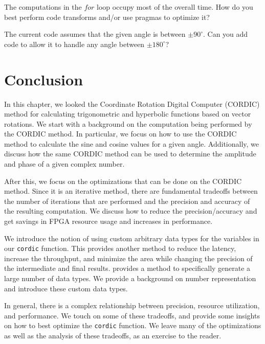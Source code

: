 \begin{exercise}
The computations in the $for$ loop occupy most of the overall time. How do you best perform code transforms and/or use pragmas to optimize it?
\end{exercise}

\begin{exercise}
The current code assumes that the given angle is between $\pm 90^{\circ}$. Can you add code to allow it to handle any angle between $\pm 180^{\circ}$?
\end{exercise}

\section{Conclusion}
In this chapter, we looked the Coordinate Rotation Digital Computer (CORDIC) method for calculating trigonometric and hyperbolic functions based on vector rotations. We start with a background on the computation being performed by the CORDIC method. In particular, we focus on how to use the CORDIC method to calculate the sine and cosine values for a given angle. Additionally, we discuss how the same CORDIC method can be used to determine the amplitude and phase of a given complex number.

After this, we focus on the optimizations that can be done on the CORDIC method. Since it is an iterative method, there are fundamental tradeoffs between the number of iterations that are performed and the precision and accuracy of the resulting computation. We discuss how to reduce the precision/accuracy and get savings in FPGA resource usage and increases in performance.

We introduce the notion of using custom arbitrary data types for the variables in our \lstinline{cordic} function. This provides another method to reduce the latency, increase the throughput, and minimize the area while changing the precision of the intermediate and final results. \VHLS provides a method to specifically generate a large number of data types. We provide a background on number representation and introduce these custom data types. 

In general, there is a complex relationship between precision, resource utilization, and performance. We touch on some of these tradeoffs, and provide some insights on how to best optimize the \lstinline{cordic} function. We leave many of the optimizations as well as the analysis of these tradeoffs, as an exercise to the reader. %